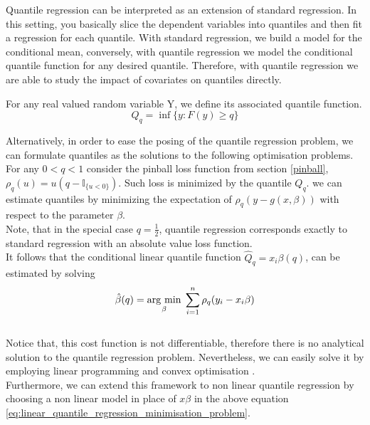 Quantile regression can be interpreted as an extension of standard regression. In this setting, you basically slice the dependent variables into quantiles and then fit a regression for each quantile. With standard regression, we build a model for the conditional mean, conversely, with quantile regression we model the conditional quantile function for any desired quantile. 
Therefore, with quantile regression we are able to study the impact of covariates on quantiles directly.
\begin{definition}
    For any real valued random variable Y, we define its associated quantile function.
    \begin{equation}
        Q_q=\inf\{y:F(y)\geq q\}
    \end{equation}
\end{definition}
Alternatively, in order  to ease the posing of the quantile regression problem, we can formulate quantiles as the solutions to the following optimisation problems.
\\
For any $0<q<1$ consider the pinball loss function from section \ref{pinball}, $\rho_q(u)=u(q-\mathbb{I}_{\{u<0\}})$. 
Such loss is minimized by the quantile $Q_q$.
 we can estimate quantiles by minimizing the expectation of $\rho_q(y-g(x,\beta))$ with respect to the parameter $\beta$.
\\
Note, that in the special case $q=\frac{1}{2}$,  quantile regression corresponds exactly to standard regression with an absolute value loss function.
\\
It follows that the conditional linear quantile function $\hat{Q}_q=x_i\beta(q)$, can be estimated by solving
\begin{equation}\label{eq:linear_quantile_regression_minimisation_problem}
    \hat{\beta}(q)=\underset{\beta}{\operatorname{arg}\,\operatorname{min}}\;\sum\limits_{i=1}^n \rho_q   (y_i-x_i \beta)
\end{equation}
\\
Notice that, this cost function is not differentiable, therefore there is no analytical solution to the quantile regression problem. Nevertheless, we can easily solve it by employing linear programming and convex optimisation \cite{boyd2004convex}.
\\
Furthermore, we can extend this framework to non linear quantile regression by choosing a non linear model in place of $x\beta$ in the above equation \ref{eq:linear_quantile_regression_minimisation_problem}.
